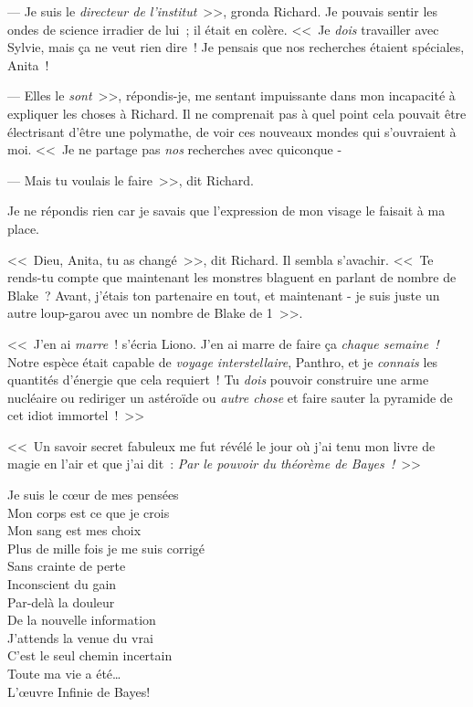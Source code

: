 --- Je suis le \emph{directeur de l'institut}~>>, gronda Richard. Je pouvais sentir les ondes de science irradier de lui~; il était en colère. <<~Je \emph{dois} travailler avec Sylvie, mais ça ne veut rien dire~! Je pensais que nos recherches étaient spéciales, Anita~!

--- Elles le \emph{sont}~>>, répondis-je, me sentant impuissante dans mon incapacité à expliquer les choses à Richard. Il ne comprenait pas à quel point cela pouvait être électrisant d'être une polymathe, de voir ces nouveaux mondes qui s'ouvraient à moi. <<~Je ne partage pas \emph{nos} recherches avec quiconque -

--- Mais tu voulais le faire~>>, dit Richard.

Je ne répondis rien car je savais que l'expression de mon visage le faisait à ma place.

<<~Dieu, Anita, tu as changé~>>, dit Richard. Il sembla s'avachir. <<~Te rends-tu compte que maintenant les monstres blaguent en parlant de nombre de Blake~? Avant, j'étais ton partenaire en tout, et maintenant - je suis juste un autre loup-garou avec un nombre de Blake de 1~>>.


<<~J'en ai \emph{marre}~! s'écria Liono. J'en ai marre de faire ça \emph{chaque semaine~!} Notre espèce était capable de \emph{voyage interstellaire}, Panthro, et je \emph{connais} les quantités d'énergie que cela requiert~! Tu \emph{dois} pouvoir construire une arme nucléaire ou rediriger un astéroïde ou \emph{autre chose} et faire sauter la pyramide de cet idiot immortel~!~>>

\clearpage
{}

<<~Un savoir secret fabuleux me fut révélé le jour où j'ai tenu mon livre de magie en l'air et que j'ai dit~: \emph{Par le pouvoir du théorème de Bayes~!}~>>


\begin{emph}
Je suis le cœur de mes pensées\\
Mon corps est ce que je crois\\
Mon sang est mes choix\\
Plus de mille fois je me suis corrigé\\
Sans crainte de perte\\
Inconscient du gain\\
Par-delà la douleur\\
De la nouvelle information\\
J'attends la venue du vrai\\
C'est le seul chemin incertain\\
Toute ma vie a été…\\
L'œuvre Infinie de Bayes!
\end{emph}

